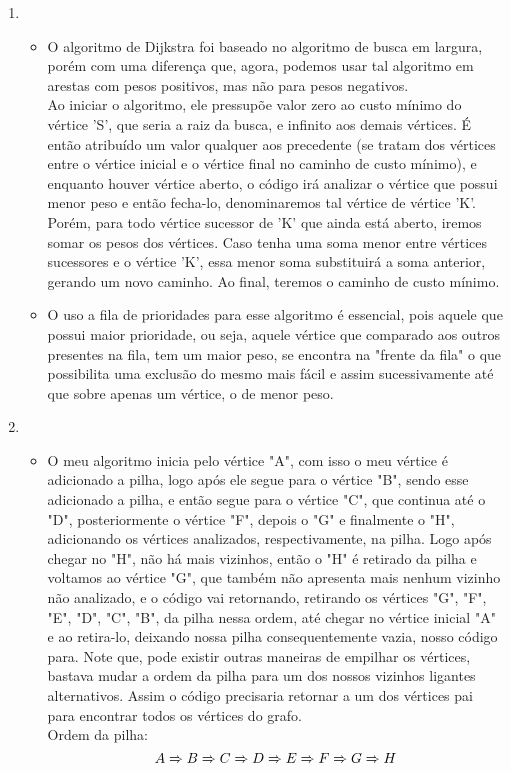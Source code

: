 \documentclass[11pt,reqno]{amsart}
\begin{document}
\begin{enumerate}
		\item

		\begin{itemize}
			\item O algoritmo de Dijkstra foi baseado no algoritmo de busca em largura, porém com uma diferença que, agora, 
			podemos usar tal algoritmo em arestas com pesos positivos, mas não para pesos negativos. \\ Ao iniciar o 
			algoritmo, ele pressupõe valor zero ao custo mínimo do vértice 'S', que seria a raiz da busca, e infinito aos 
			demais vértices. É então atribuído um valor qualquer aos precedente (se tratam dos vértices entre o vértice 
			inicial e o vértice final no caminho de custo mínimo), e enquanto houver vértice aberto, o código irá analizar o 
			vértice que possui menor peso e então fecha-lo, denominaremos tal vértice  de vértice 'K'. Porém, para todo 
			vértice sucessor de 'K' que ainda está aberto, iremos somar os pesos dos vértices. Caso tenha uma soma menor entre 
			vértices sucessores e o vértice 'K', essa menor soma substituirá a soma anterior, gerando um novo caminho. Ao 
			final, teremos o caminho de custo mínimo.
			\item  O uso a fila de prioridades para esse algoritmo é essencial, pois aquele que possui maior prioridade, ou 
			seja, aquele vértice que comparado aos outros presentes na fila, tem um maior peso, se encontra na "frente da 
			fila" o que possibilita uma exclusão do mesmo mais fácil e assim sucessivamente até que sobre apenas um vértice, o 
			de menor peso.
		\end{itemize}
		\vspace{0.4cm}

		\item

		\begin{itemize}
			\item O meu algoritmo inicia pelo vértice "A", com isso o meu vértice é adicionado a pilha, logo após ele segue 
			para o vértice "B", sendo esse adicionado a pilha, e então segue para o vértice "C", que continua até o "D", 
			posteriormente o vértice "F", depois o "G" e finalmente o "H", adicionando os vértices analizados, 
			respectivamente, na pilha. Logo após chegar no "H", não há mais vizinhos, então o "H" é retirado da pilha e 
			voltamos ao vértice "G", que também não apresenta mais nenhum vizinho não analizado, e o código vai retornando, 
			retirando os vértices "G", "F", "E", "D", "C", "B", da pilha nessa ordem, até chegar no vértice inicial "A" e ao 
			retira-lo, deixando nossa pilha consequentemente vazia, nosso código para. Note que, pode existir outras maneiras 
			de empilhar os vértices, bastava mudar a ordem da pilha para um dos nossos vizinhos ligantes alternativos. Assim o 
			código precisaria retornar a um dos vértices pai para encontrar todos os vértices do grafo. \\ Ordem da pilha: \[ A\xRightarrow[ ]{ } B \xRightarrow[ ]{ } C \xRightarrow[ ]{ } D \xRightarrow[ ]{ } E \xRightarrow[ ]{ } F \xRightarrow[ ]{ } G \xRightarrow[ ]{ } H \]
		\end{itemize}
		\vspace{0.4cm}


\end{enumerate}
\end{document}
